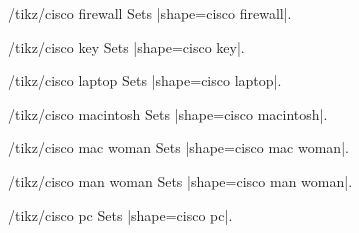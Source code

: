 \documentclass[a4paper]{ltxdoc}
\begin{document}
\begin{stylekey}{/tikz/cisco firewall}
Sets |shape={cisco firewall}|.
\begin{codeexample}[preamble={\usetikzlibrary{shapes.cisco.firewall}}]
\end{codeexample}
\end{stylekey}

\begin{stylekey}{/tikz/cisco key}
Sets |shape={cisco key}|.
\begin{codeexample}[preamble={\usetikzlibrary{shapes.cisco.key}}]
\end{codeexample}
\end{stylekey}

\begin{stylekey}{/tikz/cisco laptop}
Sets |shape={cisco laptop}|.
\begin{codeexample}[preamble={\usetikzlibrary{shapes.cisco.laptop}}]
\end{codeexample}
\end{stylekey}

\begin{stylekey}{/tikz/cisco macintosh}
Sets |shape={cisco macintosh}|.
\begin{codeexample}[preamble={\usetikzlibrary{shapes.cisco.macintosh}}]
\end{codeexample}
\end{stylekey}

\begin{stylekey}{/tikz/cisco mac woman}
Sets |shape={cisco mac woman}|.
\begin{codeexample}[preamble={\usetikzlibrary{shapes.cisco.macwoman}}]
\end{codeexample}
\end{stylekey}

\begin{stylekey}{/tikz/cisco man woman}
Sets |shape={cisco man woman}|.
\begin{codeexample}[preamble={\usetikzlibrary{shapes.cisco.manwoman}}]
\end{codeexample}
\end{stylekey}

\begin{stylekey}{/tikz/cisco pc}
Sets |shape={cisco pc}|.
\begin{codeexample}[preamble={\usetikzlibrary{shapes.cisco.pc}}]
\tikz{\node[cisco pc] {};}
\end{codeexample}
\end{stylekey}
\end{document}
